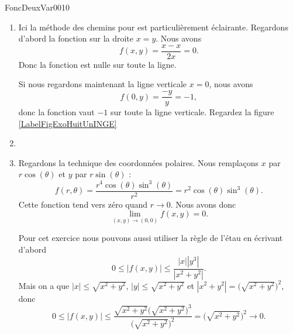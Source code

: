 
\begin{corrige}{FoncDeuxVar0010}

	\begin{enumerate}

		\item
			Ici la méthode des chemins pour est particulièrement éclairante. Regardons d'abord la fonction sur la droite $x=y$. Nous avons
			\begin{equation}
				f(x,y)=\frac{ x-x }{ 2x }=0.
			\end{equation}
			Donc la fonction est nulle sur toute la ligne.

			Si nous regardons maintenant la ligne verticale $x=0$, nous avons
			\begin{equation}
				f(0,y)=\frac{ -y }{ y }=-1,
			\end{equation}
			donc la fonction vaut $-1$ sur toute la ligne verticale.
Regardez la figure \ref{LabelFigExoHuitUnINGE}

		\item

		\item
			Regardons la technique des coordonnées polaires. Nous remplaçons $x$ par $r\cos(\theta)$ et $y$ par $r\sin(\theta)$ :
			\begin{equation}
				f(r,\theta)=\frac{ r^4\cos(\theta)\sin^3(\theta) }{ r^2 }=r^2\cos(\theta)\sin^3(\theta).
			\end{equation}
			Cette fonction tend vers zéro quand $r\to 0$. Nous avons donc 
			\begin{equation}
				\lim_{(x,y)\to(0,0)}f(x,y)=0.
			\end{equation}

			Pour cet exercice nous pouvons aussi utiliser la règle de l'étau en écrivant d'abord
			\begin{equation}
				0\leq | f(x,y) |\leq\frac{ | x | |y^3 | }{ | x^2+y^2 | }.
			\end{equation}
			Mais on a que $| x |\leq\sqrt{x^2+y^2}$, $| y |\leq\sqrt{x^2+y^2}$ et $| x^2+y^2 |=\big( \sqrt{x^2+y^2} \big)^2$, donc
			\begin{equation}
				0\leq| f(x,y) |\leq \frac{ \sqrt{x^2+y^2}\big( \sqrt{x^2+y^2} \big)^3 }{ \big( \sqrt{x^2+y^2} \big)^2 }=\big( \sqrt{x^2+y^2} \big)^2\to 0.
			\end{equation}


\end{enumerate}
\end{corrige}
